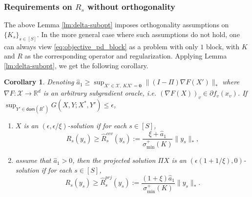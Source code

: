 \documentclass[10pt]{article}
\newcommand{\mc}{\mathcal}
\newcommand{\mb}{\mathbf}
\newcommand{\R}{\mathbb{R}}
\newcommand{\domain}{\mathsf{dom}}
\newtheorem{corollary}{Corollary}[section]
\begin{document}
   
\subsubsection{Requirements on $R_s$ without orthogonality}
The above Lemma \ref{lm:delta-subopt} imposes orthogonality assumptions on $\{K_s\}_{s\in [S]}$. In the more general case where such assumptions do not hold, one can always view \eqref{eq:objective_pd_block} as a problem with only $1$ block, with $K$ and $R$ as the corresponding operator and regularization. Applying Lemma \ref{lm:delta-subopt}, we get the following corollary. 

\begin{corollary}\label{cor:delta_subopt}
Denoting $\widehat{a}_1 \geq \sup_{X'\in {\mc X},~KX'=\mb 0} \|(I-\Pi)\nabla F(X')\|_*$
    where $\nabla F:{\mc X}\to \R^{d}$ is an arbitrary subgradient oracle, i.e. $(\nabla F(X))_v\in \partial f_v(x_v)$. If $\sup_{Y'\in \domain(R^*)} G(X,Y;X^*,Y')\leq \epsilon$, 
    \begin{enumerate}
        \item $X$ is an $(\epsilon,\epsilon/\xi)$-solution if for each $s\in [S]$,
    \begin{equation}\label{eq:r_1}
        R_s(y_s) \geq \widehat{R}^{ccv}_s(y_s):=\frac{\xi + \widehat{a}_1 }{\sigma_{\min}^+(K)}\|y_s\|_*,
    \end{equation}
    \item  assume that $\widehat{a}_1>0$, then the projected solution $\Pi X$ is an $(\epsilon(1+1/\xi),0)$-solution if for each $s\in [S]$, 
    \begin{equation}\label{eq:r_2}
        R_s(y_s) \geq \widehat{R}^{prj}_s(y_s):=\frac{(1+\xi) \widehat{a}_1 }{\sigma_{\min}^+(K)}\|y_s\|_*.
    \end{equation}
    \end{enumerate}
    
    
    
\end{corollary}

\end{document}
